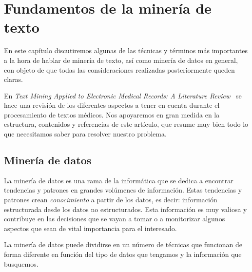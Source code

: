 \chapter{Fundamentos de la minería de texto}
En este capítulo discutiremos algunas de las técnicas y términos más importantes a la hora de hablar de minería de texto, así como minería de datos en general, con objeto de que todas las consideraciones realizadas posteriormente queden claras.

En \textit{Text Mining Applied to Electronic Medical Records: A Literature Review}~\cite{textmining2015} se hace una revisión de los diferentes aspectos a tener en cuenta durante el procesamiento de textos médicos. Nos apoyaremos en gran medida en la estructura, contenidos y referencias de este artículo, que resume muy bien todo lo que necesitamos saber para resolver nuestro problema.

\section{Minería de datos}
La minería de datos es una rama de la informática que se dedica a encontrar tendencias y patrones en grandes volúmenes de información. Estas tendencias y patrones crean \textit{conocimiento} a partir de los datos, es decir: información estructurada desde los datos no estructurados. Esta información es muy valiosa y contribuye en las decisiones que se vayan a tomar o a monitorizar algunos aspectos que sean de vital importancia para el interesado. 

La minería de datos puede dividirse en un número de técnicas que funcionan de forma diferente en función del tipo de datos que tengamos y la información que busquemos.

